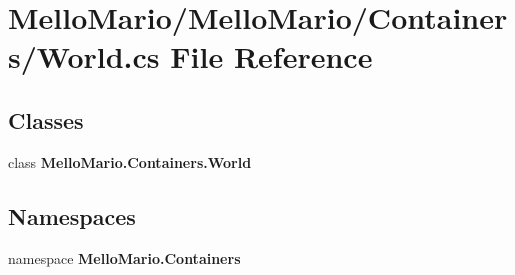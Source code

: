 \section{Mello\+Mario/\+Mello\+Mario/\+Containers/\+World.cs File Reference}
\label{World_8cs}
\subsection*{Classes}
\begin{DoxyCompactItemize}
\item 
class \textbf{ Mello\+Mario.\+Containers.\+World}
\end{DoxyCompactItemize}
\subsection*{Namespaces}
\begin{DoxyCompactItemize}
\item 
namespace \textbf{ Mello\+Mario.\+Containers}
\end{DoxyCompactItemize}
